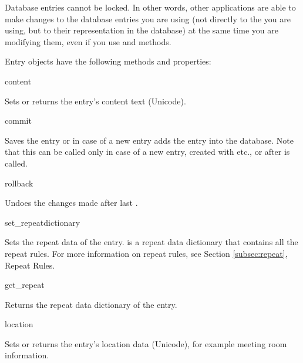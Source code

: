 Database entries cannot be locked. In other words, other applications are 
able to make changes to the database entries you are using (not directly to 
the  you are using, but to their representation in the 
database) at the same time you are modifying them, even if you use 
 and  methods. 

\begin{classdesc*}{Entry}
 objects have the following methods and properties:

\begin{memberdesc}[Entry]{content}

Sets or returns the entry's content text (Unicode).

\end{memberdesc}

\begin{methoddesc}[Entry]{commit}{}

Saves the entry or in case of a new entry adds the entry into the database. 
Note that this can be called only in case of a new entry, created with 
 etc., or after  is called. 

\end{methoddesc}

\begin{methoddesc}[Entry]{rollback}{}

Undoes the changes made after last .

\end{methoddesc}

\begin{methoddesc}[Entry]{set_repeat}{dictionary}

Sets the repeat data of the entry.  is a repeat data dictionary 
that contains all the repeat rules. For more information on repeat rules, see 
Section \ref{subsec:repeat}, Repeat Rules.

\end{methoddesc}

\begin{methoddesc}[Entry]{get_repeat}{}

Returns the repeat data dictionary of the entry.

\end{methoddesc}

\begin{memberdesc}[Entry]{location}

Sets or returns the entry's location data (Unicode), for example meeting 
room information. 


\end{memberdesc}
\end{classdesc*}
